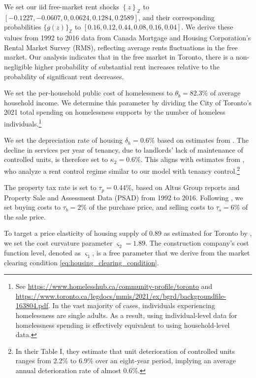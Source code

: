 \documentclass[parskip=full]{article}
\begin{document}
We set our iid free-market rent shocks $\left\{z\right\}_{\mathbb{Z}}$ to $\left[-0.1227,-0.0607,0,0.0624,0.1284,0.2589\right]$, and their corresponding probabilities $\{g(z)\}_{\mathbb{Z}}$ to $\left[0.16,0.12,0.44,0.08,0.16,0.04\right]$. We derive these values from 1992 to 2016 data from Canada Mortgage and Housing Corporation's Rental Market Survey (RMS), reflecting average rents fluctuations in the free market. Our analysis indicates that in the free market in Toronto, there is a non-negligible higher probability of substantial rent increases relative to the probability of significant rent decreases.

We set the per-household public cost of homelessness to $\theta_{b}=82.3\%$ of average household income. We determine this parameter by dividing the City of Toronto's 2021 total spending on homelessness supports by the number of homeless individuals.\footnote{See \url{https://www.homelesshub.ca/community-profile/toronto} and \url{https://www.toronto.ca/legdocs/mmis/2021/ex/bgrd/backgroundfile-163804.pdf}. In the vast majority of cases, individuals experiencing homelessness are single adults. As a result, using individual-level data for homelessness spending is effectively equivalent to using household-level data.}

We set the depreciation rate of housing $\delta_h=0.6\%$ based on estimates from \citet{rosenthal-2014}. The decline in services per year of tenancy, due to landlords' lack of maintenance of controlled units, is therefore set to $\kappa_{2}=0.6\%$. This aligns with estimates from \citet{murray_et_al-1991}, who analyze a rent control regime similar to our model with tenancy control.\footnote{In their Table I, they estimate that unit deterioration of controlled units ranges from 2.2\% to 6.9\% over an eight-year period, implying an average annual deterioration rate of almost 0.6\%.}

The property tax rate is set to $\tau_p=0.44\%$, based on Altus Group reports and Property Sale and Assessment Data (PSAD) from 1992 to 2016. Following \citet{gm-2003}, we set buying costs to $\tau_{b}=2\%$ of the purchase price, and selling costs to $\tau_{s}=6\% $ of the sale price.

To target a price elasticity of housing supply of 0.89 as estimated for Toronto by \citet{piaxao-2021}, we set the cost curvature parameter $\varsigma_{2}=1.89$. The construction company's cost function level, denoted as $\varsigma_1$, is a free parameter that we derive from the market clearing condition \eqref{eq:housing_clearing_condition}.
\end{document}
